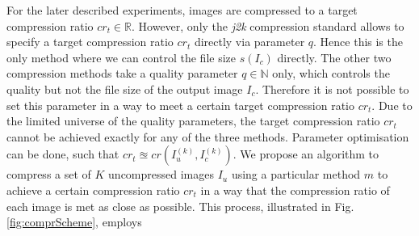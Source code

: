 \documentclass[10pt,twocolumn,letterpaper]{article}
\begin{document}
For the later described experiments, images are compressed to a target compression ratio $cr_t \in \mathbb{R}$. However, only the \emph{j2k} compression standard allows to specify a target compression ratio $cr_t$ directly via parameter $q$. Hence this is the only method where we can control the file size $s(I_c)$ directly. The other two compression methods take a quality parameter $q \in \mathbb{N}$ only, which controls the quality but not the file size of the output image $I_c$. Therefore it is not possible to set this parameter in a way to meet a certain target compression ratio $cr_t$. Due to the limited universe of the quality parameters, the target compression ratio $cr_t$ cannot be achieved exactly for any of the three methods. Parameter optimisation can be done, such that $cr_t \approxeq cr(I_u^{(k)}, I_c^{(k)})$. We propose an algorithm to compress a set of $K$ uncompressed images $I_u$ using a particular method $m$ to achieve a certain compression ratio $cr_t$ in a way that the compression ratio of each image is met as close as possible. 
This process, illustrated in Fig. \ref{fig:comprScheme}, employs
\end{document}
